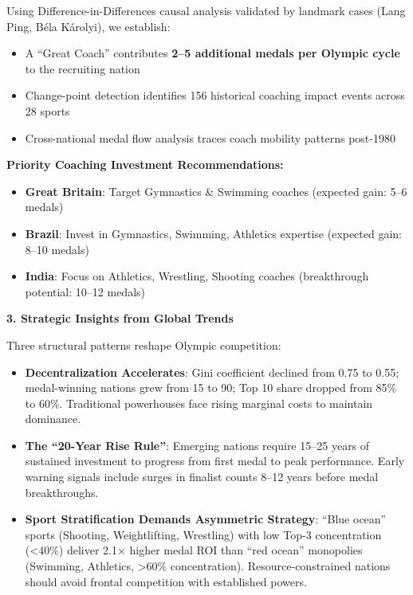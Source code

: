 \documentclass{mcmthesis}
\begin{document}
Using Difference-in-Differences causal analysis validated by landmark cases (Lang Ping, Béla Károlyi), we establish:
\begin{itemize}
    \item A ``Great Coach'' contributes \textbf{2--5 additional medals per Olympic cycle} to the recruiting nation
    \item Change-point detection identifies 156 historical coaching impact events across 28 sports
    \item Cross-national medal flow analysis traces coach mobility patterns post-1980
\end{itemize}

\textbf{Priority Coaching Investment Recommendations:}
\begin{itemize}
    \item \textbf{Great Britain}: Target Gymnastics \& Swimming coaches (expected gain: 5--6 medals)
    \item \textbf{Brazil}: Invest in Gymnastics, Swimming, Athletics expertise (expected gain: 8--10 medals)
    \item \textbf{India}: Focus on Athletics, Wrestling, Shooting coaches (breakthrough potential: 10--12 medals)
\end{itemize}

\textbf{3. Strategic Insights from Global Trends}

Three structural patterns reshape Olympic competition:
\begin{itemize}
    \item \textbf{Decentralization Accelerates}: Gini coefficient declined from 0.75 to 0.55; medal-winning nations grew from 15 to 90; Top 10 share dropped from 85\% to 60\%. Traditional powerhouses face rising marginal costs to maintain dominance.
    
    \item \textbf{The ``20-Year Rise Rule''}: Emerging nations require 15--25 years of sustained investment to progress from first medal to peak performance. Early warning signals include surges in finalist counts 8--12 years before medal breakthroughs.
    
    \item \textbf{Sport Stratification Demands Asymmetric Strategy}: ``Blue ocean'' sports (Shooting, Weightlifting, Wrestling) with low Top-3 concentration (<40\%) deliver 2.1× higher medal ROI than ``red ocean'' monopolies (Swimming, Athletics, >60\% concentration). Resource-constrained nations should avoid frontal competition with established powers.
\end{itemize}
\end{document}
